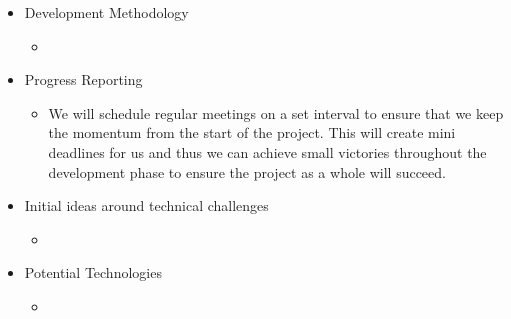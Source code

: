 \begin{itemize}
	\item Development Methodology
	\begin{itemize}
		\item[] %
	\end{itemize}
	
	\item Progress Reporting
	\begin{itemize}
		\item[] We will schedule regular meetings on a set interval to ensure that we keep the momentum from the start of the project. This will create mini deadlines for us and thus we can achieve small victories throughout the development phase to ensure the project as a whole will succeed.
	\end{itemize}
	
	\item Initial ideas around technical challenges
	\begin{itemize}
		\item[] %
	\end{itemize}
	
	\item Potential Technologies
	\begin{itemize}
		\item[] %
	\end{itemize}
	

\end{itemize}
